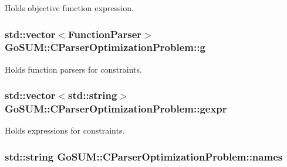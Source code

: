 Holds objective function expression. 

\hypertarget{class_go_s_u_m_1_1_c_parser_optimization_problem_a8ba8e1a4d04ba3ca2bc8367bf3c8aa19}{
\subsubsection[{g}]{\setlength{\rightskip}{0pt plus 5cm}std\-::vector$<$Function\-Parser$>$ Go\-S\-U\-M\-::\-C\-Parser\-Optimization\-Problem\-::g\hspace{0.3cm}{\ttfamily [protected]}}}\label{class_go_s_u_m_1_1_c_parser_optimization_problem_a8ba8e1a4d04ba3ca2bc8367bf3c8aa19}
Holds function parsers for constraints. \hypertarget{class_go_s_u_m_1_1_c_parser_optimization_problem_a41e738f2f8251c6229a7aafd671cced0}{
\subsubsection[{gexpr}]{\setlength{\rightskip}{0pt plus 5cm}std\-::vector$<$std\-::string$>$ Go\-S\-U\-M\-::\-C\-Parser\-Optimization\-Problem\-::gexpr\hspace{0.3cm}{\ttfamily [protected]}}}\label{class_go_s_u_m_1_1_c_parser_optimization_problem_a41e738f2f8251c6229a7aafd671cced0}


Holds expressions for constraints. 

\hypertarget{class_go_s_u_m_1_1_c_parser_optimization_problem_aa7f4b76eee9da8610745c67772c768d1}{
\subsubsection[{names}]{\setlength{\rightskip}{0pt plus 5cm}std\-::string Go\-S\-U\-M\-::\-C\-Parser\-Optimization\-Problem\-::names\hspace{0.3cm}{\ttfamily [protected]}}}\label{class_go_s_u_m_1_1_c_parser_optimization_problem_aa7f4b76eee9da8610745c67772c768d1}



